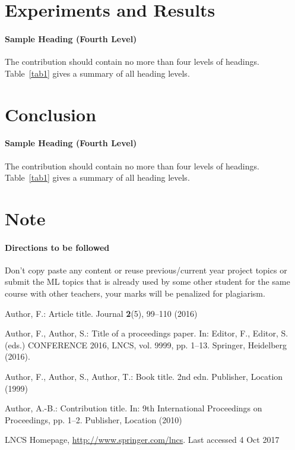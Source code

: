 \documentclass[runningheads]{llncs}
\begin{document}
\section{Experiments and Results\textsl{}}

\paragraph{Sample Heading (Fourth Level)}
The contribution should contain no more than four levels of
headings. Table~\ref{tab1} gives a summary of all heading levels.


\section{Conclusion}

\paragraph{Sample Heading (Fourth Level)}
The contribution should contain no more than four levels of
headings. Table~\ref{tab1} gives a summary of all heading levels.



\section{Note}

\paragraph{Directions to be followed}
Don’t copy paste any content or reuse previous/current year project topics or submit the ML topics that is already used by some other student for the same course with other teachers, your marks will be penalized for plagiarism.




%
%
%
% 
% 
%
\begin{thebibliography}{8}
Author, F.: Article title. Journal \textbf{2}(5), 99--110 (2016)

Author, F., Author, S.: Title of a proceedings paper. In: Editor,
F., Editor, S. (eds.) CONFERENCE 2016, LNCS, vol. 9999, pp. 1--13.
Springer, Heidelberg (2016). 

Author, F., Author, S., Author, T.: Book title. 2nd edn. Publisher,
Location (1999)

Author, A.-B.: Contribution title. In: 9th International Proceedings
on Proceedings, pp. 1--2. Publisher, Location (2010)

LNCS Homepage, \url{http://www.springer.com/lncs}. Last accessed 4
Oct 2017
\end{thebibliography}
\end{document}
